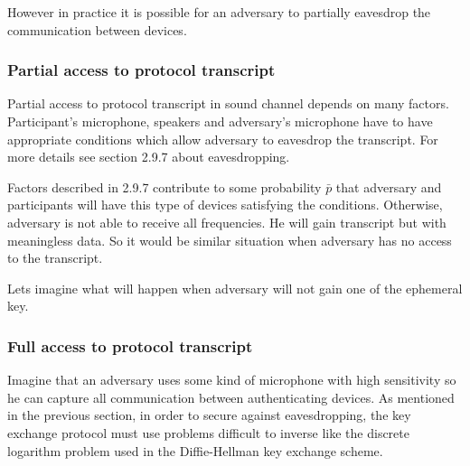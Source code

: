 \documentclass[11pt,titlepage]{article}
\theoremstyle{plain}
\begin{document}
\vspace{5mm}

However in practice it is possible for an adversary to partially eavesdrop the communication between devices.

\subsubsection{Partial access to protocol transcript}

Partial access to protocol transcript in sound channel depends on many factors. Participant's microphone, speakers and adversary's microphone have to have appropriate conditions which allow adversary to eavesdrop the transcript. For more details see section 2.9.7 about eavesdropping.

\vspace{5mm}

Factors described in 2.9.7 contribute to some probability $\bar{p}$ that adversary and participants will have this type of devices satisfying the conditions. Otherwise, adversary is not able to receive all frequencies. He will gain transcript but with meaningless data. So it would be similar situation when adversary has no access to the transcript.  

\vspace{5mm}

Lets imagine what will happen when adversary will not gain one of the ephemeral key.
\subsubsection{Full access to protocol transcript}
Imagine that an adversary uses some kind of microphone with high sensitivity so he can capture all communication between authenticating devices. As mentioned in the previous section, in order to secure against eavesdropping, the key exchange protocol must use problems difficult to inverse like the discrete logarithm problem used in the Diffie-Hellman key exchange scheme.
\end{document}
